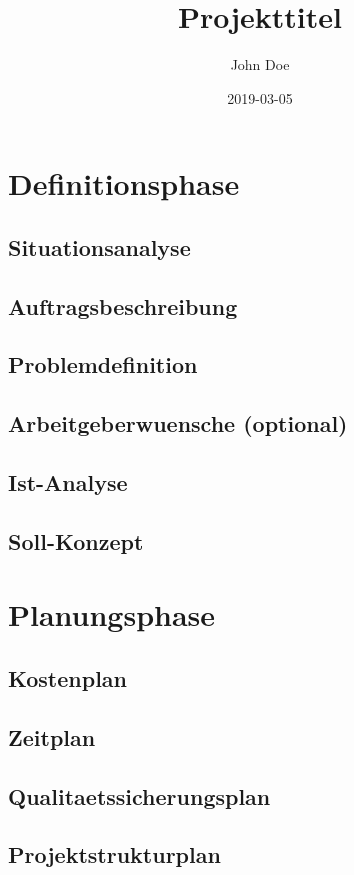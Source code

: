 \documentclass[11pt, a4paper]{article}
\title{Projekttitel}
\date{2019-03-05}
\author{John Doe}
\begin{document}
  \maketitle
  \newpage

  \tableofcontents
  \newpage


  \section{Definitionsphase}
    \subsection{Situationsanalyse}
    \subsection{Auftragsbeschreibung}
    \subsection{Problemdefinition}
    \subsection{Arbeitgeberwuensche (optional)}
    \subsection{Ist-Analyse}
    \subsection{Soll-Konzept}
    \newpage

  \section{Planungsphase}
    \subsection{Kostenplan}
    \subsection{Zeitplan}
    \subsection{Qualitaetssicherungsplan}
    \subsection{Projektstrukturplan}
    \newpage
\end{document}
